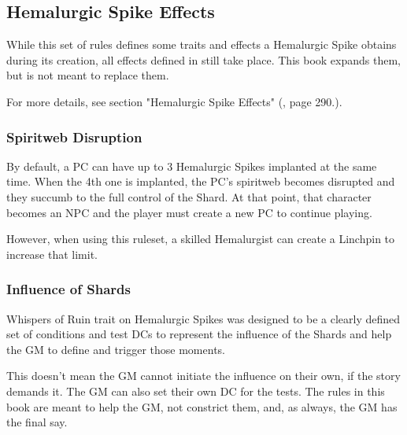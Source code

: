 \subsection{Hemalurgic Spike Effects}

While this set of rules defines some traits and effects a Hemalurgic Spike obtains during its creation, all effects defined in \handbookMistborn{} still take place. This book expands them, but is not meant to replace them.

For more details, see section "Hemalurgic Spike Effects" (\handbookMistborn{}, page 290.).

\subsubsection{Spiritweb Disruption}

By default, a PC can have up to 3 Hemalurgic Spikes implanted at the same time. When the 4th one is implanted, the PC's spiritweb becomes disrupted and they succumb to the full control of the Shard. At that point, that character becomes an NPC and the player must create a new PC to continue playing.

However, when using this ruleset, a skilled Hemalurgist can create a Linchpin to increase that limit.

\subsubsection{Influence of Shards}

Whispers of Ruin trait on Hemalurgic Spikes was designed to be a clearly defined set of conditions and test DCs to represent the influence of the Shards and help the GM to define and trigger those moments.

This doesn't mean the GM cannot initiate the influence on their own, if the story demands it. The GM can also set their own DC for the tests. The rules in this book are meant to help the GM, not constrict them, and, as always, the GM has the final say.
